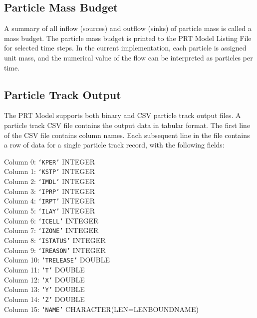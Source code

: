 \subsection{Particle Mass Budget}
A summary of all inflow (sources) and outflow (sinks) of particle mass is called a mass budget.  The particle mass budget is printed to the PRT Model Listing File for selected time steps.  In the current implementation, each particle is assigned unit mass, and the numerical value of the flow can be interpreted as particles per time.

\subsection{Particle Track Output}

The PRT Model supports both binary and CSV particle track output files. A particle track CSV file contains the output data in tabular format. The first line of the CSV file contains column names. Each subsequent line in the file contains a row of data for a single particle track record, with the following fields:

\vspace{5mm}
\noindent Column 0: \texttt{`KPER'} {\color{red} \footnotesize{INTEGER}} \\
\noindent Column 1: \texttt{`KSTP'} {\color{red} \footnotesize{INTEGER}} \\
\noindent Column 2: \texttt{`IMDL'} {\color{red} \footnotesize{INTEGER}} \\
\noindent Column 3: \texttt{`IPRP'} {\color{red} \footnotesize{INTEGER}} \\
\noindent Column 4: \texttt{`IRPT'} {\color{red} \footnotesize{INTEGER}} \\
\noindent Column 5: \texttt{`ILAY'} {\color{red} \footnotesize{INTEGER}} \\
\noindent Column 6: \texttt{`ICELL'} {\color{red} \footnotesize{INTEGER}} \\
\noindent Column 7: \texttt{`IZONE'} {\color{red} \footnotesize{INTEGER}} \\
\noindent Column 8: \texttt{`ISTATUS'} {\color{red} \footnotesize{INTEGER}} \\
\noindent Column 9: \texttt{`IREASON'} {\color{red} \footnotesize{INTEGER}} \\
\noindent Column 10: \texttt{`TRELEASE'} {\color{red} \footnotesize{DOUBLE}} \\
\noindent Column 11: \texttt{`T'} {\color{red} \footnotesize{DOUBLE}} \\
\noindent Column 12: \texttt{`X'} {\color{red} \footnotesize{DOUBLE}} \\
\noindent Column 13: \texttt{`Y'} {\color{red} \footnotesize{DOUBLE}} \\
\noindent Column 14: \texttt{`Z'} {\color{red} \footnotesize{DOUBLE}} \\
\noindent Column 15: \texttt{`NAME'} {\color{red} \footnotesize{CHARACTER(LEN=LENBOUNDNAME)}} \\

